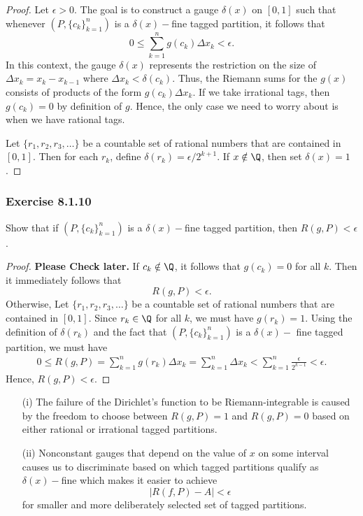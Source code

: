 \begin{proof}
    Let \( \epsilon > 0  \). The goal is to construct a gauge \( \delta(x)  \) on \( [0,1]  \) such that whenever \( (P, \{ c_{k }  \}_{k=1}^{n}  ) \) is a \( \delta(x)- \)fine tagged partition, it follows that 
    \[  0 \leq \sum_{ k=1 }^{ n } g(c_{k }) \Delta x_{k} < \epsilon. \]
    In this context, the gauge \( \delta(x)  \) represents the restriction on the size of \( \Delta x_{k } = x_{k } - x_{k-1} \) where \( \Delta x_{k } < \delta(c_{k }) \). Thus, the Riemann sums for the \( g(x) \) consists of products of the form \( g(c_{k }) \Delta x_{k } \). If we take irrational tags, then \( g(c_{k}) = 0  \) by definition of \( g  \). Hence, the only case we need to worry about is when we have rational tags.

    Let \( \{ r_{1}, r_{2},  r_{3}, \dots \}  \) be a countable set of rational numbers that are contained in \( [0,1]  \). Then for each \( r_{k }  \), define \( \delta(r_{k }) = \epsilon / 2^{k+1} \). If \( x \notin \Q  \), then set \( \delta(x) = 1  \).
\end{proof}

\subsubsection{Exercise 8.1.10} Show that if \( (P, \{ c_{k } \}_{k=1}^n ) \) is a \( \delta(x)- \)fine tagged partition, then \( R(g,P) < \epsilon \).
\begin{proof}
    \textbf{Please Check later.} If \( c_{k } \notin \Q  \), it follows that \( g(c_{k}) = 0  \) for all \( k  \). Then it immediately follows that 
    \[  R(g,P) < \epsilon. \] 
    Otherwise, Let \( \{ r_{1}, r_{2}, r_{3}, \dots  \}  \) be a countable set of rational numbers that are contained in \( [0,1]  \). Since \( r_{k } \in \Q \) for all \( k  \), we must have \( g(r_{k }) = 1  \). Using the definition of \( \delta(r_{k })  \) and the fact that \( (P, \{ c_{k } \}_{k=1}^n)  \) is a \( \delta(x)-\) fine tagged partition, we must have 
    \begin{align*}
       0 \leq R(g, P)  = \sum_{ k=1 }^{n } g(r_{k }) \Delta x_{k }
                = \sum_{ k=1 }^{ n } \Delta x_{k } 
                < \sum_{ k=1 }^{ n } \frac{ \epsilon  }{ 2^{k-1} }  
                < \epsilon.
    \end{align*}
    Hence, \( R(g,P) < \epsilon. \)
\end{proof}


\begin{enumerate}
    \item[(i)] The failure of the Dirichlet's function to be Riemann-integrable is caused by the freedom to choose between \( R(g,P)  = 1  \) and \( R(g,P) = 0  \) based on either rational or irrational tagged partitions.  
    \item[(ii) ] Nonconstant gauges that depend on the value of \( x  \) on some interval causes us to discriminate based on which tagged partitions qualify as \( \delta(x)- \)fine which makes it easier to achieve
        \[  | R(f,P) - A  | < \epsilon \]
        for smaller and more deliberately selected set of tagged partitions.
\end{enumerate}

